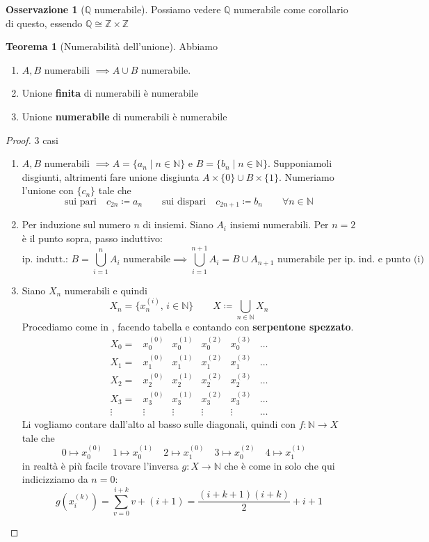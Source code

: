 \documentclass[a4paper,10pt]{article}
\theoremstyle{definition}
\newcommand{\na}{\mathbb{N}} %
\newcommand{\za}{\mathbb{Z}} %
\newcommand{\qu}{\mathbb{Q}} %
\theoremstyle{indentdefinition}
\theoremstyle{indentpostulate}
\theoremstyle{indenttheorem}
\newtheorem{thm}{Teorema}[section]
\theoremstyle{myremark}
\newtheorem*{rem*}{Osservazione}
\theoremstyle{indentgeneral}
\newenvironment{myboxed} 
{\noindent\begin{lrbox}{\mybox}\begin{minipage}{\textwidth}}
{\end{minipage}\end{lrbox}\fbox{\usebox{\mybox}}}
\begin{document}
\begin{rem*}[$\qu$ numerabile]
    Possiamo vedere $\qu$ numerabile come corollario di questo, essendo $\qu\cong \za\times\za$
\end{rem*}

\begin{myboxed}
\begin{thm}[Numerabilità dell'unione] \label{thm-numerabilità-unione}Abbiamo
\begin{enumerate}
    \item $A,B$ numerabili $\implies A\cup B$ numerabile. 
    \item  Unione \textbf{finita} di numerabili è numerabile
    \item Unione \textbf{numerabile} di numerabili è numerabile
\end{enumerate}
\end{thm}
\end{myboxed}

\begin{proof} 3 casi
\begin{enumerate}
    \item $A,B$ numerabili $\implies A=\{a_n\mid n\in \na\}$ e $B=\{b_n\mid n\in \na\}$. Supponiamoli disgiunti, altrimenti fare unione disgiunta $A\times\{0\}\cup B\times\{1\}$. Numeriamo l'unione con $\{c_n\}$ tale che
    $$\text{sui pari}\quad c_{2n}\coloneqq a_n\qquad \text{sui dispari}\quad c_{2n+1}\coloneqq b_n\qquad\forall n\in \na$$
    \item Per induzione sul numero $n$ di insiemi. Siano $A_i$ insiemi numerabili. Per $n=2$ è il punto sopra, passo induttivo:
    $$\text{ip. indutt.: }B=\bigcup_{i=1}^nA_i \text{ numerabile}\implies \boxed{\bigcup_{i=1}^{n+1}A_i=B\cup A_{n+1}} \text{ numerabile per ip. ind. e punto (i)}$$
    \item Siano $X_n$ numerabili e quindi
    $$X_n=\{x_n^{(i)},\, i\in \na\}\qquad X\coloneqq \bigcup_{n\in\na}X_n$$
    Procediamo come in , facendo tabella e contando con \textbf{serpentone spezzato}.
    $$\begin{array}{c|ccccc}
       X_0=  & x_0^{(0)} & x_0^{(1)} &x_0^{(2)} &x_0^{(3)} & \dots \\
        X_1=  & x_1^{(0)} & x_1^{(1)} &x_1^{(2)} &x_1^{(3)} & \dots\\
        X_2=  & x_2^{(0)} & x_2^{(1)} &x_2^{(2)} &x_2^{(3)} & \dots\\
        X_3=  & x_3^{(0)} & x_3^{(1)} &x_3^{(2)} &x_3^{(3)} & \dots\\
        \vdots & \vdots & \vdots & \vdots & \vdots & \dots
    \end{array}$$
    Li vogliamo contare dall'alto al basso sulle diagonali, quindi con $f:\na\to X$ tale che
    $$0\mapsto x_0^{(0)}\quad 1\mapsto x_0^{(1)}\quad2\mapsto x_1^{(0)}\quad3\mapsto x_0^{(2)}\quad4\mapsto x_1^{(1)}\quad$$
    in realtà è più facile trovare l'inversa $g: X\to\na$ che è come in  solo che qui indicizziamo da $n=0$:
    $$g(x_i^{(k)})=\sum_{v=0}^{i+k}v+(i+1)=\frac{(i+k+1)(i+k)}{2}+i+1$$
\end{enumerate}
\end{proof}
\end{document}
